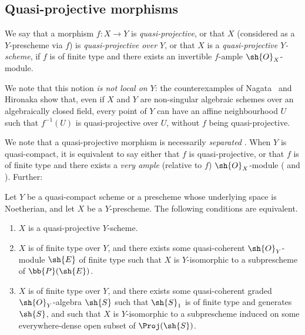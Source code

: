 \subsection{Quasi-projective morphisms}
\label{subsection:II.5.3}

\begin{definition}[5.3.1]
\label{II.5.3.1}
We say that a morphism $f:X\to Y$ is \emph{quasi-projective}, or that $X$ (considered as a $Y$-prescheme via $f$) is \emph{quasi-projective over $Y$}, or that $X$ is a \emph{quasi-projective $Y$-scheme}, if $f$ is of finite type and there exists an invertible $f$-ample $\sh{O}_X$-module.
\end{definition}

We note that this notion \emph{is not local on $Y$}:
the counterexamples of Nagata~\cite{II-26} and Hironaka show that, even if $X$ and $Y$ are non-singular algebraic schemes over an algebraically closed field, every point of $Y$ can have an affine neighbourhood $U$ such that $f^{-1}(U)$ is quasi-projective over $U$, without $f$ being quasi-projective.

We note that a quasi-projective morphism is necessarily \emph{separated} .
When $Y$ is quasi-compact, it is equivalent to say either that $f$ is quasi-projective, or that $f$ is of finite type and there exists a \emph{very ample} (relative to $f$) $\sh{O}_X$-module ( and ).
Further:

\begin{proposition}[5.3.2]
\label{II.5.3.2}
Let $Y$ be a quasi-compact scheme or a prescheme whose underlying space is Noetherian, and let $X$ be a $Y$-prescheme.
The following conditions are equivalent.
\begin{enumerate}
  \item[{\rm(a)}] $X$ is a quasi-projective $Y$-scheme.
  \item[{\rm(b)}] $X$ is of finite type over $Y$, and there exists some quasi-coherent $\sh{O}_Y$-module $\sh{E}$ of finite type such that $X$ is $Y$-isomorphic to a subprescheme of $\bb{P}(\sh{E})$.
  \item[{\rm(c)}] $X$ is of finite type over $Y$, and there exists some quasi-coherent graded $\sh{O}_Y$-algebra $\sh{S}$ such that $\sh{S}_1$ is of finite type and generates $\sh{S}$, and such that $X$ is $Y$-isomorphic to a subprescheme induced on some everywhere-dense open subset of $\Proj(\sh{S})$.
\end{enumerate}
\end{proposition}

